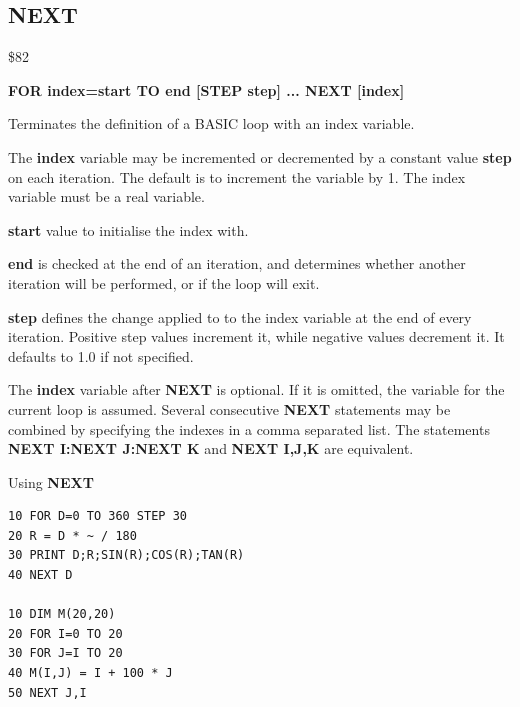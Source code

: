 \subsection{NEXT}
\begin{description}[leftmargin=2cm,style=nextline]
\item [Token:] \$82
\item [Format:] {\bf FOR index=start TO end [STEP step] ... NEXT [index]}
\item [Usage:] Terminates the definition
               of a BASIC loop with an index variable.

               The {\bf index} variable may be incremented or decremented
               by a constant value {\bf step} on each iteration. The default
               is to increment the variable by 1.
               The index variable must be a real variable.

               {\bf start} value to initialise the index with.

               {\bf end} is checked at the end of an iteration,
               and determines whether another iteration will be performed,
               or if the loop will exit.

               {\bf step} defines the change applied to
               to the index variable at the end of every iteration.
               Positive step values increment it, while negative values
               decrement it. It defaults to 1.0 if not specified.

\item [Remarks:] The {\bf index} variable after {\bf NEXT} is
               optional. If it is omitted, the variable
               for the current loop is assumed.
               Several consecutive {\bf NEXT} statements may be
               combined by specifying the indexes in a comma
               separated list. The statements
               {\bf NEXT I:NEXT J:NEXT K} and
               {\bf NEXT I,J,K} are equivalent.

\item [Example:] Using {\bf NEXT}
\begin{tcolorbox}[colback=black,coltext=white]
\verbatimfont{\codefont}
\begin{verbatim}
10 FOR D=0 TO 360 STEP 30
20 R = D * ~ / 180
30 PRINT D;R;SIN(R);COS(R);TAN(R)
40 NEXT D

10 DIM M(20,20)
20 FOR I=0 TO 20
30 FOR J=I TO 20
40 M(I,J) = I + 100 * J
50 NEXT J,I
\end{verbatim}
\end{tcolorbox}
\end{description}

